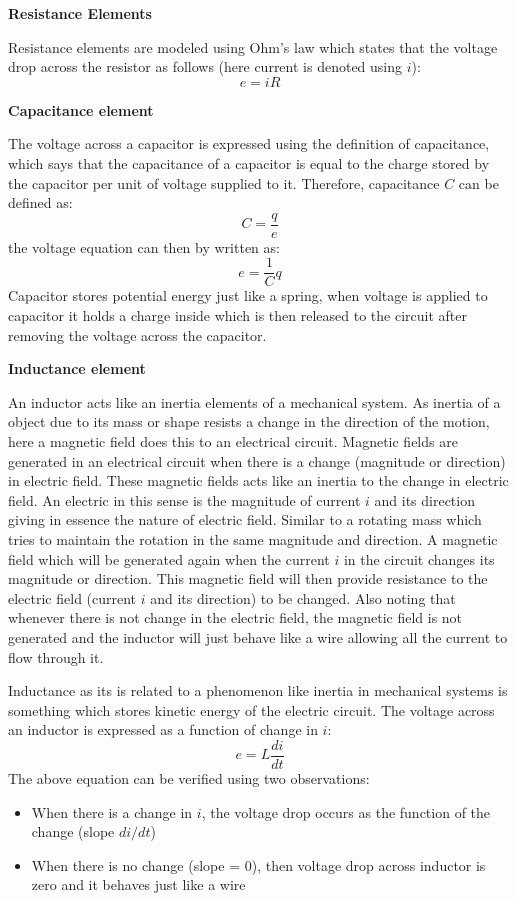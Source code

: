 \textbf{Resistance Elements}

Resistance elements are modeled using Ohm's law which states that the voltage drop across the resistor as follows (here current is denoted using $i$):
\begin{equation}
	e = i R
\end{equation}

\textbf{Capacitance element}

The voltage across a capacitor is expressed using the definition of capacitance, which says that the capacitance of a capacitor is equal to the charge stored by the capacitor per unit of voltage supplied to it. Therefore, capacitance $C$ can be defined as:
\begin{equation}
	C = \frac{q}{e}
\end{equation}
the voltage equation can then by written as:
\begin{equation}
	e = \frac{1}{C} q
\end{equation}
Capacitor stores potential energy just like a spring, when voltage is applied to capacitor it holds a charge inside which is then released to the circuit after removing the voltage across the capacitor. 

\textbf{Inductance element}

An inductor acts like an inertia elements of a mechanical system. As inertia of a object due to its mass or shape resists a change in the direction of the motion, here a magnetic field does this to an electrical circuit. Magnetic fields are generated in an electrical circuit when there is a change (magnitude or direction) in electric field. These magnetic fields acts like an inertia to the change in electric field. An electric in this sense is the magnitude of current $i$ and its direction giving in essence the nature of electric field. Similar to a rotating mass which tries to maintain the rotation in the same magnitude and direction. A magnetic field which will be generated again when the current $i$ in the circuit changes its magnitude or direction. This magnetic field will then provide resistance to the electric field (current $i$ and its direction) to be changed. Also noting that whenever there is not change in the electric field, the magnetic field is not generated and the inductor will just behave like a wire allowing all the current to flow through it.

Inductance as its is related to a phenomenon like inertia in mechanical systems is something which stores kinetic energy of the electric circuit. The voltage across an inductor is expressed as a function of change in $i$:
\begin{equation}
	e = L \frac{di}{dt}
\end{equation}
The above equation can be verified using two observations:
\begin{itemize}
	\item When there is a change in $i$, the voltage drop occurs as the function of the change (slope $di/dt$)
	\item When there is no change (slope = 0), then voltage drop across inductor is zero and it behaves just like a wire
\end{itemize}

